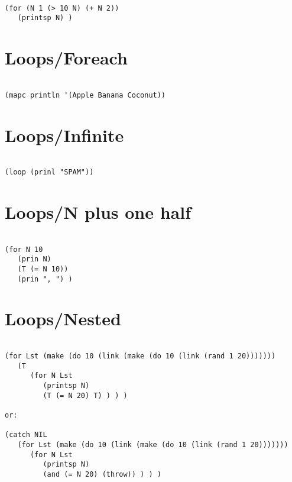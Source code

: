 \begin{verbatim}

(for (N 1 (> 10 N) (+ N 2))
   (printsp N) )

\end{verbatim}

\section*{Loops/Foreach}

\begin{verbatim}

(mapc println '(Apple Banana Coconut))

\end{verbatim}

\section*{Loops/Infinite}

\begin{verbatim}

(loop (prinl "SPAM"))

\end{verbatim}

\section*{Loops/N plus one half}

\begin{verbatim}

(for N 10
   (prin N)
   (T (= N 10))
   (prin ", ") )

\end{verbatim}

\section*{Loops/Nested}

\begin{verbatim}

(for Lst (make (do 10 (link (make (do 10 (link (rand 1 20)))))))
   (T
      (for N Lst
         (printsp N)
         (T (= N 20) T) ) ) )

or:

(catch NIL
   (for Lst (make (do 10 (link (make (do 10 (link (rand 1 20)))))))
      (for N Lst
         (printsp N)
         (and (= N 20) (throw)) ) ) )

\end{verbatim}


